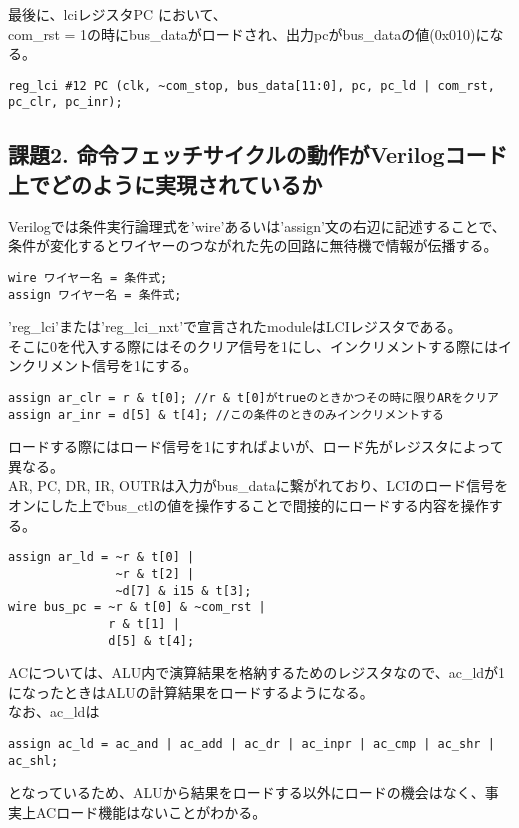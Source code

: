 \documentclass{jsarticle}
\begin{document}
最後に、lciレジスタPC	において、 \\
com\_rst = 1の時にbus\_dataがロードされ、出力pcがbus\_dataの値(0x010)になる。

\begin{lstlisting}[caption=cpu\_ex3.v 89行目]
reg_lci #12 PC (clk, ~com_stop, bus_data[11:0], pc, pc_ld | com_rst, pc_clr, pc_inr);
\end{lstlisting}


\subsection*{課題2. 命令フェッチサイクルの動作がVerilogコード上でどのように実現されているか}

Verilogでは条件実行論理式を'wire'あるいは'assign'文の右辺に記述することで、条件が変化するとワイヤーのつながれた先の回路に無待機で情報が伝播する。

\begin{lstlisting}[]
wire ワイヤー名 = 条件式;
assign ワイヤー名 = 条件式;
\end{lstlisting}
'reg\_lci'または'reg\_lci\_nxt'で宣言されたmoduleはLCIレジスタである。\\
そこに0を代入する際にはそのクリア信号を1にし、インクリメントする際にはインクリメント信号を1にする。

\begin{lstlisting}[caption=ARの場合]
assign ar_clr = r & t[0]; //r & t[0]がtrueのときかつその時に限りARをクリア
assign ar_inr = d[5] & t[4]; //この条件のときのみインクリメントする
\end{lstlisting}

ロードする際にはロード信号を1にすればよいが、ロード先がレジスタによって異なる。\\
AR, PC, DR, IR, OUTRは入力がbus\_dataに繋がれており、LCIのロード信号をオンにした上でbus\_ctlの値を操作することで間接的にロードする内容を操作する。

\begin{lstlisting}[caption=$\overline R \cdot T(0) \Rightarrow AR \leftarrow PC$の場合]
assign ar_ld = ~r & t[0] |
               ~r & t[2] |
               ~d[7] & i15 & t[3];
wire bus_pc = ~r & t[0] & ~com_rst |
              r & t[1] |
              d[5] & t[4];
\end{lstlisting}
ACについては、ALU内で演算結果を格納するためのレジスタなので、ac\_ldが1になったときはALUの計算結果をロードするようになる。\\
なお、ac\_ldは
\begin{lstlisting}
assign ac_ld = ac_and | ac_add | ac_dr | ac_inpr | ac_cmp | ac_shr | ac_shl;
\end{lstlisting}
となっているため、ALUから結果をロードする以外にロードの機会はなく、事実上ACロード機能はないことがわかる。
\end{document}
